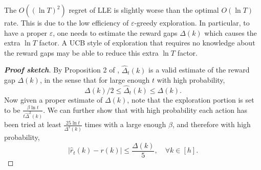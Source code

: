 \begin{remk}
	The $O((\ln T)^2)$ regret of LLE is slightly worse than the optimal $O(\ln T)$ rate. 
	This is due to the low efficiency of $\varepsilon$-greedy exploration.
	In particular, to have a proper $\varepsilon$, one needs to estimate the reward gaps $\Delta(k)$ which causes the extra $\ln T$ factor.
	A UCB style of exploration that requires no knowledge about the reward gaps may be able to reduce this extra $\ln T$ factor.
\end{remk}
\begin{proof} [\bf Proof sketch]
		By Proposition 2 of \citep{seldin2017improved}, $\hat{\Delta}_t(k)$ is a valid estimate of the reward gap $\Delta(k)$, in the sense that for large enough $t$ with high probability, 
		\begin{equation*}
		    \Delta(k)/2 \le \hat{\Delta}_t(k) \le 	\Delta(k).
		\end{equation*}
		Now given a proper estimate of $\Delta(k)$, note that the exploration portion is set to be $\frac{\beta\ln t}{t \hat{\Delta}^2(k)}$.
		We can further show that with high probability each action has been tried at least $\frac{25 \ln t}{\Delta^2(k)}$ times with a large enough $\beta$, and therefore with high probability, 
		\begin{equation*}
		    \left| \hat{r}_t(k) - r(k) \right| \le \frac{\Delta(k)}{5}, \quad \forall k \in [h].
		\end{equation*}
	

\end{proof}
